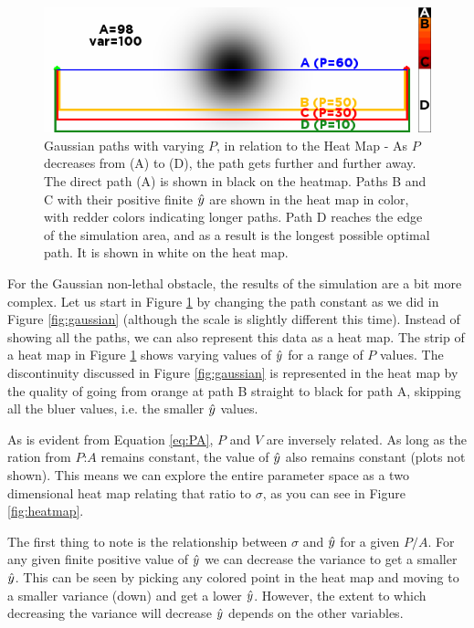 \begin{figure}
\includegraphics[width=\columnwidth]{graphix/SomePaths.png}
\caption{Gaussian paths with varying $P$, in relation to the Heat Map - As $P$ decreases from (A) to (D), the path gets further and further away. The direct path (A) is shown in black on the heatmap. Paths B and C with their positive finite $\hat{y}$ are shown in the heat map in color, with redder colors indicating longer paths. Path D reaches the edge of the simulation area, and as a result is the longest possible optimal path. It is shown in white on the heat map.}
\label{fig:somepaths}
\end{figure}

For the Gaussian non-lethal obstacle, the results of the simulation are a bit more complex. Let us start in Figure \ref{fig:somepaths} by changing the path constant as we did in Figure \ref{fig:gaussian} (although the scale is slightly different this time). Instead of showing all the paths, we can also represent this data as a heat map. The strip of a heat map in Figure \ref{fig:somepaths} shows varying values of $\hat{y}$ for a range of $P$ values. The discontinuity discussed in Figure \ref{fig:gaussian} is represented in the heat map by the quality of going from orange at path B straight to black for path A, skipping all the bluer values, i.e. the smaller $\hat{y}$ values. 

As is evident from Equation \ref{eq:PA}, $P$ and $V$ are inversely related. As long as the ration from $P$:$A$ remains constant, the value of $\hat{y}$ also remains constant (plots not shown). This means we can explore the entire parameter space as a two dimensional heat map relating that ratio to $\sigma$, as you can see in Figure \ref{fig:heatmap}. 

The first thing to note is the relationship between $\sigma$ and $\hat{y}$ for a given $P/A$. For any given finite positive value of $\hat{y}$ we can decrease the variance to get a smaller $\hat{y}$. This can be seen by picking any colored point in the heat map and moving to a smaller variance (down) and get a lower $\hat{y}$. However, the extent to which decreasing the variance will decrease $\hat{y}$ depends on the other variables. 

